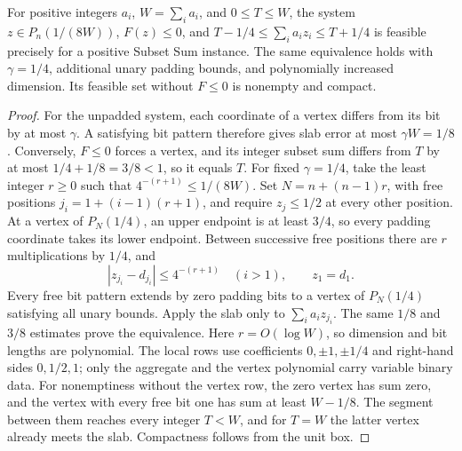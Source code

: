 \begin{lemma}\label{lem:klee-padding}
For positive integers \(a_i\), \(W=\sum_i a_i\), and \(0\le T\le W\), the
system \(z\in P_n(1/(8W))\), \(F(z)\le0\), and
\(T-1/4\le\sum_i a_i z_i\le T+1/4\) is feasible precisely for a positive
Subset Sum instance. The same equivalence holds with \(\gamma=1/4\), additional
unary padding bounds, and polynomially increased dimension. Its feasible set
without \(F\le0\) is nonempty and compact.
\end{lemma}
\begin{proof}
For the unpadded system, each coordinate of a vertex differs from its bit by
at most \(\gamma\). A satisfying bit pattern therefore gives slab error at most
\(\gamma W=1/8\). Conversely, \(F\le0\) forces a vertex, and its integer
subset sum differs from \(T\) by at most \(1/4+1/8=3/8<1\), so it equals
\(T\).
For fixed \(\gamma=1/4\), take the least integer \(r\ge0\) such that
\(4^{-(r+1)}\le1/(8W)\). Set \(N=n+(n-1)r\), with free positions
\(j_i=1+(i-1)(r+1)\), and require \(z_j\le1/2\) at every other position.
At a vertex of \(P_N(1/4)\), an upper endpoint is at least \(3/4\),
so every padding coordinate takes its lower endpoint. Between successive free
positions there are \(r\) multiplications by \(1/4\), and
\[
 |z_{j_i}-d_{j_i}|\le4^{-(r+1)}\quad(i>1),\qquad z_1=d_1.
\]
Every free bit pattern extends by zero padding bits to a vertex of
\(P_N(1/4)\) satisfying all unary bounds. Apply the slab only to
\(\sum_i a_i z_{j_i}\). The same \(1/8\) and \(3/8\) estimates prove the
equivalence. Here \(r=O(\log W)\), so dimension and bit lengths are polynomial.
The local rows use coefficients \(0,\pm1,\pm1/4\) and right-hand sides
\(0,1/2,1\); only the aggregate and the vertex polynomial carry variable binary
data. For nonemptiness without the vertex row, the zero vertex has sum zero,
and the vertex with every free bit one has sum at least \(W-1/8\). The
segment between them reaches every integer \(T<W\), and for \(T=W\) the
latter vertex already meets the slab. Compactness follows from the unit box.
\end{proof}


